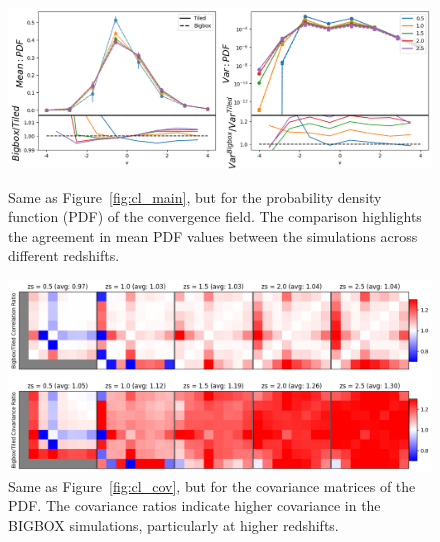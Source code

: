 \begin{figure}[p]
    \centering
    \includegraphics[width=\textwidth]{figures/results/pdf_main.png}
    \caption[PDF Mean and Variance]{Same as Figure~\ref{fig:cl_main}, but for the probability density function (PDF) of the convergence field. The comparison highlights the agreement in mean PDF values between the simulations across different redshifts.}
    \label{fig:pdf_main}
    \vspace{2cm}
    \includegraphics[width=\textwidth]{figures/results/pdf_cov.png}
    \caption[PDF Covariance]{Same as Figure~\ref{fig:cl_cov}, but for the covariance matrices of the PDF. The covariance ratios indicate higher covariance in the BIGBOX simulations, particularly at higher redshifts.}
    \label{fig:pdf_cov}
\end{figure}

